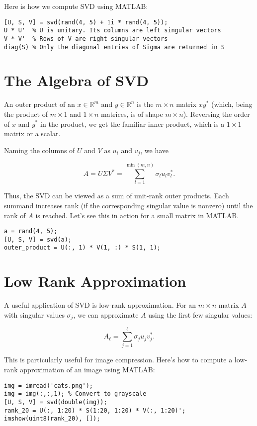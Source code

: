 \documentclass{ximera}
\begin{document}
\begin{problem}
Here is how we compute SVD using MATLAB:

\begin{verbatim}
[U, S, V] = svd(rand(4, 5) + 1i * rand(4, 5));
U * U'  % U is unitary. Its columns are left singular vectors
V * V'  % Rows of V are right singular vectors
diag(S) % Only the diagonal entries of Sigma are returned in S
\end{verbatim}

\section{The Algebra of SVD}

An outer product of an \( x \in \mathbb{R}^m \) and \( y \in \mathbb{R}^n \) is the \( m \times n \) matrix \( x y^* \) (which, being the product of \( m \times 1 \) and \( 1 \times n \) matrices, is of shape \( m \times n \)). Reversing the order of \( x \) and \( y^* \) in the product, we get the familiar inner product, which is a \( 1 \times 1 \) matrix or a scalar.

Naming the columns of \( U \) and \( V \) as \( u_i \) and \( v_j \), we have

\[
A = U \Sigma V^* = \sum_{l=1}^{\min(m,n)} \sigma_l u_l v_l^*.
\]

Thus, the SVD can be viewed as a sum of unit-rank outer products. Each summand increases rank (if the corresponding singular value is nonzero) until the rank of \( A \) is reached. Let's see this in action for a small matrix in MATLAB.

\begin{verbatim}
a = rand(4, 5);
[U, S, V] = svd(a);
outer_product = U(:, 1) * V(1, :) * S(1, 1);
\end{verbatim}

\section{Low Rank Approximation}

A useful application of SVD is low-rank approximation. For an \( m \times n \) matrix \( A \) with singular values \( \sigma_j \), we can approximate \( A \) using the first few singular values:

\[
A_\ell = \sum_{j=1}^\ell \sigma_j u_j v_j^*.
\]

This is particularly useful for image compression. Here’s how to compute a low-rank approximation of an image using MATLAB:

\begin{verbatim}
img = imread('cats.png');
img = img(:,:,1); % Convert to grayscale
[U, S, V] = svd(double(img));
rank_20 = U(:, 1:20) * S(1:20, 1:20) * V(:, 1:20)';
imshow(uint8(rank_20), []);
\end{verbatim}


\end{problem}
\end{document}
